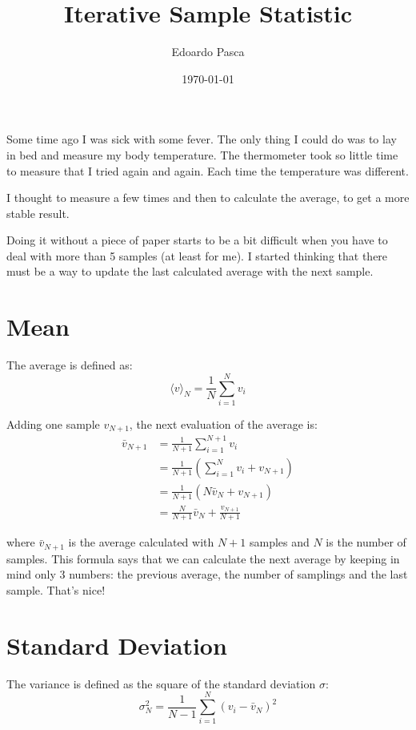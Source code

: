 \documentclass[a4paper]{article}
\author{Edoardo Pasca}
\title{Iterative Sample Statistic}
\date{\today}
\newcommand{\avg}{\bar{v}}
\begin{document}
\maketitle
Some time ago I was sick with some fever. The only thing I could do was to lay in bed and measure my body temperature. The thermometer took so little time to measure that I tried again and again. Each time the temperature was different.

I thought to measure a few times and then to calculate the average, to get a more stable result.

Doing it without a piece of paper starts to be a bit difficult when you have to deal with more than 5 samples (at least for me). I started thinking that there must be a way to update the last calculated average with the next sample.

\section{Mean}
The average is defined as:
\begin{equation}
\langle v\rangle_N = \frac{1}{N} \sum_{i=1}^N v_i
\label{eq:avg_def}
\end{equation}

Adding one sample $v_{N+1}$, the next evaluation of the average is:
\begin{align}
\avg_{N+1}  & =  \frac{1}{N+1} \sum_{i=1}^{N+1} v_i \nonumber \\
 & =  \frac{1}{N+1} \left( \sum_{i=1}^{N} v_i + v_{N+1} \right) \nonumber\\
 & =  \frac{1}{N+1} \left( N \avg_{N} + v_{N+1} \right) \nonumber\\
 & =  \frac{N}{N+1} \avg_{N} + \frac{v_{N+1}}{N+1}
\label{eq:iterative-avg}
\end{align}


where $\avg_{N+1}$ is the average calculated with $N+1$ samples and $N$ is 
the number of samples. This formula says that we can calculate the next 
average by keeping in mind only 3 numbers: the previous average, the number
of samplings and the last sample. That's nice!

\section{Standard Deviation}
The variance is defined as the square of the standard deviation $\sigma$:
\begin{equation}
\sigma_N^2 = \frac{1}{N-1} \sum_{i=1}^N \left(v_i - \avg_N\right)^2
\label{eq:std_def}
\end{equation}
\end{document}
